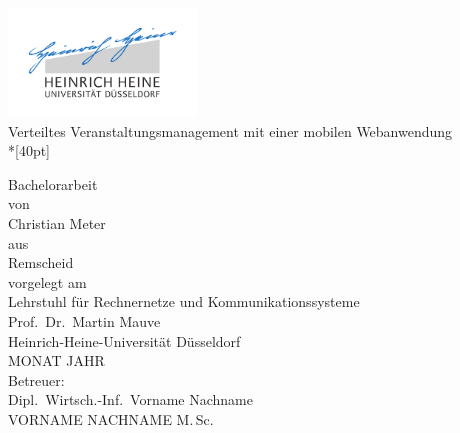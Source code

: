 
\begin{titlepage}
  \centering
  \includegraphics[width=5cm]{fig/unilogo}\\

  \vfill
  \huge
  Verteiltes Veranstaltungsmanagement mit einer mobilen Webanwendung\\*[40pt]
  \normalsize

  \vfill
  \large
  Bachelorarbeit\\[0.25em]
  \normalsize
  von\\
  \Large
  Christian Meter\\

  \vspace{5mm}
  \normalsize
  aus\\ Remscheid\\[1cm]
  vorgelegt am\\[5mm]
  Lehrstuhl für Rechnernetze und Kommunikationssysteme\\
  Prof.\ Dr.\ Martin Mauve\\ 
  Heinrich-Heine-Universität Düsseldorf\\[0.5cm]
  MONAT JAHR\\[0.5cm]
  Betreuer:\\
  Dipl.\ Wirtsch.-Inf.\ Vorname Nachname\\
  VORNAME NACHNAME M.\,Sc.
    
\end{titlepage}


